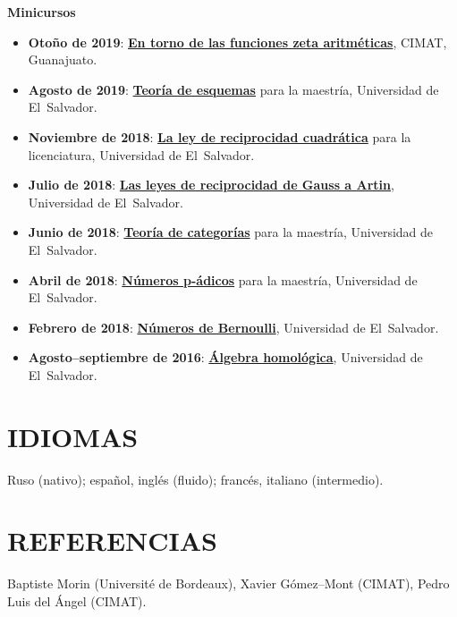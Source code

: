 \documentclass{article}
\begin{document}
\noindent\textbf{Minicursos}

\begin{itemize}
\item \textbf{Otoño de 2019}:
  \href{https://cadadr.org/cimat-zeta/}{\textbf{En torno de las funciones zeta aritméticas}},
  CIMAT, Guanajuato.

\item \textbf{Agosto de 2019}:
  \href{https://cadadr.org/san-salvador/2019-esquemas/}{\textbf{Teoría de esquemas}}
  para la maestría, Universidad de El~Salvador.

\item \textbf{Noviembre de 2018}:
  \href{https://cadadr.org/san-salvador/2018-cp-tne/reciprocidad-cuadratica.pdf}{\textbf{La ley de reciprocidad cuadrática}}
  para la licenciatura, Universidad de El~Salvador.

\item \textbf{Julio de 2018}:
  \href{https://cadadr.org/san-salvador/2018-07-reciprocidad/reciprocidad.pdf}{\textbf{Las leyes de reciprocidad de Gauss a Artin}},
  Universidad de El~Salvador.

\item \textbf{Junio de 2018}:
  \href{https://cadadr.org/san-salvador/2018-06-categorias/}{\textbf{Teoría de categorías}}
  para la maestría, Universidad de El~Salvador.

\item \textbf{Abril de 2018}:
  \href{https://cadadr.org/san-salvador/2018-04-numeros-p-adicos/}{\textbf{Números p-ádicos}}
  para la maestría, Universidad de El~Salvador.

\item \textbf{Febrero de 2018}:
  \href{https://cadadr.org/san-salvador/2017-02-bernoulli/}{\textbf{Números de Bernoulli}},
  Universidad de El~Salvador.

\item \textbf{Agosto–septiembre de 2016}:
  \href{https://cadadr.org/san-salvador/2016-08-homo/}{\textbf{Álgebra homológica}},
  Universidad de El~Salvador.
\end{itemize}

{\color{RoyalBlue}\section*{IDIOMAS}}

Ruso (nativo); español, inglés (fluido); francés, italiano (intermedio).

\vspace{1em}

{\color{RoyalBlue}\section*{REFERENCIAS}}

Baptiste Morin (Université de Bordeaux),
Xavier Gómez--Mont (CIMAT),
Pedro Luis del Ángel (CIMAT).
\end{document}
